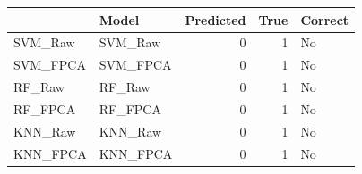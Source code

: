 
\begin{tabular}{llrrl}
\toprule
  & Model & Predicted & True & Correct\\
\midrule
SVM\_Raw & SVM\_Raw & 0 & 1 & No\\
SVM\_FPCA & SVM\_FPCA & 0 & 1 & No\\
RF\_Raw & RF\_Raw & 0 & 1 & No\\
RF\_FPCA & RF\_FPCA & 0 & 1 & No\\
KNN\_Raw & KNN\_Raw & 0 & 1 & No\\
\addlinespace
KNN\_FPCA & KNN\_FPCA & 0 & 1 & No\\
\bottomrule
\end{tabular}
